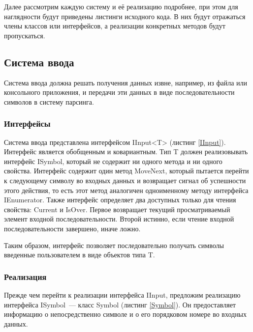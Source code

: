 Далее рассмотрим каждую систему и её реализацию подробнее, при этом для наглядности будут приведены листинги исходного кода. В них будут отражаться члены классов или интерфейсов, а реализации конкретных методов будут пропускаться.

\subsection{Система ввода}

Система ввода должна решать получения данных извне, например, из файла или консольного приложения, и передачи эти данных в виде последовательности символов в систему парсинга.

\subsubsection{Интерфейсы}

Система ввода представлена интерфейсом IInput<T> (листинг \ref{IInput}). Интерфейс является обобщенным и ковариантным. Тип T должен реализовывать интерфейс ISymbol, который не содержит ни одного метода и ни одного свойства. Интерфейс содержит один метод MoveNext, который пытается перейти к следующему символу во входных данных и возвращает сигнал об успешности этого действия, то есть этот метод аналогичен одноименному методу интерфейса IEnumerator. Также интерфейс определяет два доступных только для чтения свойства: Current и IsOver. Первое возвращает текущий просматриваемый элемент входной последовательности. Второй истинно, если чтение входной последовательности завершено, иначе ложно.

Таким образом, интерфейс позволяет последовательно получать символы введенные пользователем в виде объектов типа T.



\subsubsection{Реализация}

Прежде чем перейти к реализации интерфейса IInput, предложим реализацию интерфейса ISymbol~--- класс Symbol (листинг \ref{Symbol}). Он предоставляет информацию о непосредственно символе и о его порядковом номере во входных данных.



